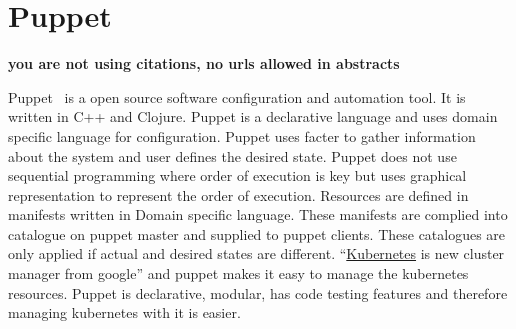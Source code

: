 \section{Puppet}

{\bf you are not using citations, no urls allowed in abstracts}

Puppet~\cite{hid-sp18-413-puppet} is a open source software
configuration and automation tool. It is written in C++ and
Clojure. Puppet is a declarative language and uses domain specific
language for configuration. Puppet uses facter to gather information
about the system and user defines the desired state. Puppet does not
use sequential programming where order of execution is key but uses
graphical representation to represent the order of
execution. Resources are defined in manifests written in Domain
specific language. These manifests are complied into catalogue on
puppet master and supplied to puppet clients. These catalogues are
only applied if actual and desired states are different.
``\href{https://en.wikipedia.org/wiki/Kubernetes}{Kubernetes} is new
cluster manager from google'' and puppet makes it easy to manage the
kubernetes resources. Puppet is declarative, modular, has code testing
features and therefore managing kubernetes with it is easier.

